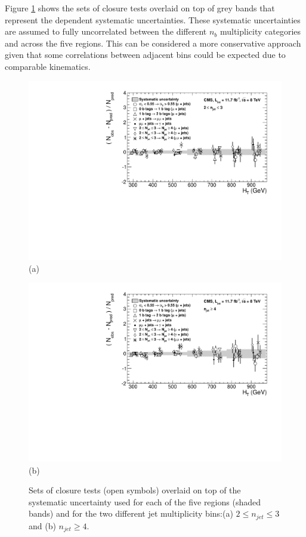 Figure \ref{fig:uncertaintyplots} shows the sets of closure tests overlaid on top of grey bands that represent the \theht dependent systematic uncertainties. These systematic uncertainties are assumed to fully uncorrelated between the different $n_{b}$ multiplicity categories and across the five \theht regions. This can be considered a more conservative approach given that some correlations between adjacent \theht bins could be expected due to comparable kinematics.


\begin{figure}[ht]
\centering
\begin{minipage}[b]{0.85 \linewidth}
\includegraphics[width = 1.0\linewidth]{plots/syst-le3j.pdf}
\centering(a)  
\end{minipage}
\quad
\begin{minipage}[b]{0.85\linewidth}
\includegraphics[width = 1.0\linewidth]{plots/syst-ge4j.pdf}
\centering(b) 
\end{minipage}
\caption[Sets of closure tests overlaid on top of the systematic uncertainty used for each of the five \theht regions.]{Sets of closure tests (open symbols) overlaid on top of the systematic uncertainty used for each of the five \theht regions (shaded bands) and for the two different jet multiplicity bins:(a) $2 \leq n_{jet} \leq 3$ and (b) $n_{jet} \geq 4$.}
\label{fig:uncertaintyplots}
\end{figure}

